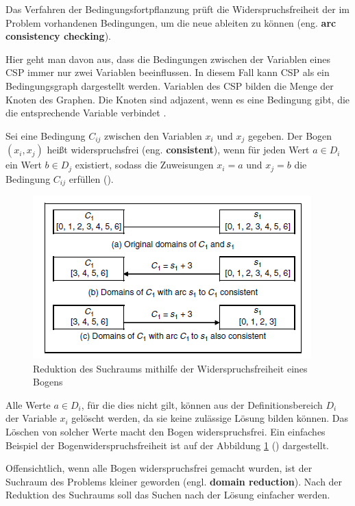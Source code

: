 Das Verfahren der Bedingungsfortpflanzung prüft die Widerspruchsfreiheit der im Problem vorhandenen Bedingungen, um die neue ableiten zu können (eng. {\bf arc consistency checking}).

Hier geht man davon aus, dass die Bedingungen zwischen der Variablen eines CSP immer nur zwei Variablen beeinflussen. In diesem Fall kann CSP als ein Bedingungsgraph dargestellt werden. Variablen des CSP bilden die Menge der Knoten des Graphen. Die Knoten sind adjazent, wenn es eine Bedingung gibt, die die entsprechende Variable verbindet \citep[vgl.][]{CSP}.

Sei eine Bedingung $C_{ij}$ zwischen den Variablen $x_i$ und $x_j$ gegeben. Der Bogen $(x_i,x_j)$ heißt widerspruchsfrei (eng. {\bf consistent}), wenn für jeden Wert $a\in D_i$ ein Wert $b\in D_j$ existiert, sodass die Zuweisungen $x_i=a$ und $x_j=b$ die Bedingung $C_{ij}$ erfüllen (\cite{CSP}).

\newpage

\begin{figure}
	\vspace{-10pt}
	\vbox{
		\centering
		\includegraphics[scale=0.7]{fig/ConstraintPropagation1.png}
	}
	\caption{Reduktion des Suchraums mithilfe der Widerspruchsfreiheit eines Bogens}
	\label{fig:ConstraintPropagation1}
\end{figure}

Alle Werte $a\in D_i$, für die dies nicht gilt, können aus der Definitionsbereich $D_i$ der Variable $x_i$ gelöscht werden, da sie keine zulässige Lösung bilden können. Das Löschen von solcher Werte macht den Bogen widerspruchsfrei. Ein einfaches Beispiel der Bogenwiderspruchsfreiheit ist auf der Abbildung \ref{fig:ConstraintPropagation1} (\cite{CPforScheduling}) dargestellt.

\FloatBarrier

Offensichtlich, wenn alle Bogen widerspruchsfrei gemacht wurden, ist der Suchraum des Problems kleiner geworden (engl. {\bf domain reduction}). Nach der Reduktion des Suchraums soll das Suchen nach der Lösung einfacher werden.


